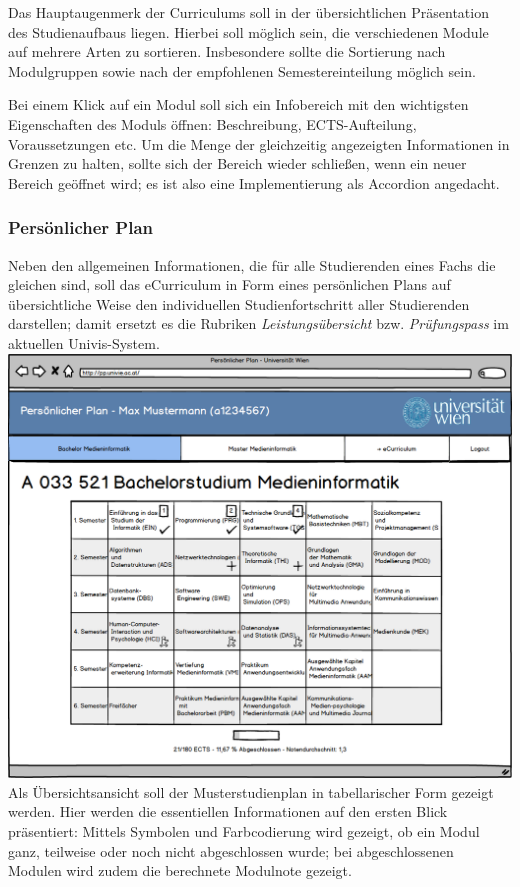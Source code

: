 \documentclass[a4paper,10pt]{scrartcl}
\begin{document}
Das Hauptaugenmerk der Curriculums soll in der übersichtlichen Präsentation des Studienaufbaus liegen. Hierbei soll möglich sein, die verschiedenen Module auf mehrere Arten zu sortieren. Insbesondere sollte die Sortierung nach Modulgruppen sowie nach der empfohlenen Semestereinteilung möglich sein.

Bei einem Klick auf ein Modul soll sich ein Infobereich mit den wichtigsten Eigenschaften des Moduls öffnen: Beschreibung, ECTS-Aufteilung, Voraussetzungen etc. Um die Menge der gleichzeitig angezeigten Informationen in Grenzen zu halten, sollte sich der Bereich wieder schließen, wenn ein neuer Bereich geöffnet wird; es ist also eine Implementierung als Accordion angedacht.

\subsubsection*{Persönlicher Plan}

Neben den allgemeinen Informationen, die für alle Studierenden eines Fachs die gleichen sind, soll das eCurriculum in Form eines persönlichen Plans auf übersichtliche Weise den individuellen Studienfortschritt aller Studierenden darstellen; damit ersetzt es die Rubriken \emph{Leistungsübersicht} bzw. \emph{Prüfungspass} im aktuellen Univis-System.\\

 \includegraphics[scale=0.35]{./lowfi-plan.png}\\

Als Übersichtsansicht soll der Musterstudienplan in tabellarischer Form gezeigt werden. Hier werden die essentiellen Informationen auf den ersten Blick präsentiert: Mittels Symbolen und Farbcodierung wird gezeigt, ob ein Modul ganz, teilweise oder noch nicht abgeschlossen wurde; bei abgeschlossenen Modulen wird zudem die berechnete Modulnote gezeigt.
\end{document}
